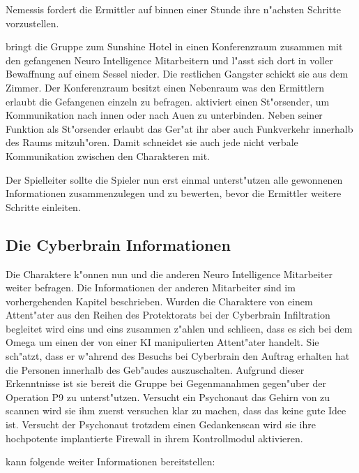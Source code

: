 Nemessis fordert die Ermittler auf binnen einer Stunde ihre n"achsten Schritte vorzustellen. 


\xl{} bringt die Gruppe zum Sunshine Hotel in einen Konferenzraum zusammen mit den gefangenen Neuro Intelligence Mitarbeitern und l"asst sich dort in voller Bewaffnung auf einem Sessel nieder. Die restlichen Gangster schickt sie aus dem Zimmer. Der Konferenzraum besitzt einen Nebenraum was den Ermittlern erlaubt die Gefangenen einzeln zu befragen. \xl{} aktiviert einen St"orsender, um Kommunikation nach innen oder nach Au\3en zu unterbinden. Neben seiner Funktion als St"orsender erlaubt das Ger"at ihr aber auch Funkverkehr innerhalb des Raums mitzuh"oren.
Damit schneidet sie auch jede nicht verbale Kommunikation zwischen den Charakteren mit.

Der Spielleiter sollte die Spieler nun erst einmal unterst"utzen alle gewonnenen Informationen zusammenzulegen und zu bewerten, bevor die Ermittler weitere Schritte einleiten. 

\subsection{Die Cyberbrain Informationen} 
Die Charaktere k"onnen nun \ml{} und die anderen Neuro Intelligence Mitarbeiter weiter befragen. Die Informationen der anderen Mitarbeiter sind im vorhergehenden Kapitel beschrieben. Wurden die Charaktere von einem Attent"ater aus den Reihen des Protektorats bei der Cyberbrain Infiltration begleitet wird \ml{} eins und eins zusammen z"ahlen und schlie\3en, dass es sich bei dem Omega um einen der von einer KI manipulierten Attent"ater handelt. Sie sch"atzt, dass er w"ahrend des Besuchs bei Cyberbrain den Auftrag erhalten hat die Personen innerhalb des Geb"audes auszuschalten. Aufgrund dieser Erkenntnisse ist sie bereit die Gruppe bei Gegenma\3nahmen gegen"uber der Operation P9 zu unterst"utzen. Versucht ein Psychonaut das Gehirn von \ml{} zu scannen wird sie ihm zuerst versuchen klar zu machen, dass das keine gute Idee ist. Versucht der Psychonaut trotzdem einen Gedankenscan wird sie ihre hochpotente implantierte Firewall in ihrem Kontrollmodul aktivieren.

\ml{} kann folgende weiter Informationen bereitstellen:

